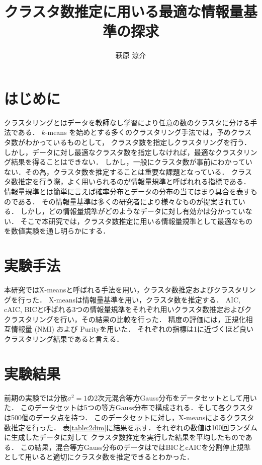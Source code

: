 \documentclass[twocolumn, 10.5pt,a4j]{ltjsarticle}
\author{萩原 涼介}
\title{クラスタ数推定に用いる最適な情報量基準の探求}
\def\tableref#1{表\ref{#1}}
\begin{document}
\maketitle

\section{はじめに}

クラスタリングとはデータを教師なし学習により任意の数のクラスタに分ける手法である．
$k$-means を始めとする多くのクラスタリング手法では，予めクラスタ数がわかっているものとして，
クラスタ数を指定しクラスタリングを行う．しかし，データに対し最適なクラスタ数を指定しなければ，最適なクラスタリング結果を得ることはできない．
しかし，一般にクラスタ数が事前にわかっていない．その為，クラスタ数を推定することは重要な課題となっている．
クラスタ数推定を行う際，よく用いられるのが情報量規準と呼ばれれる指標である．
情報量規準とは簡単に言えば確率分布とデータの分布の当てはまり具合を表すものである．
その情報量基準は多くの研究者により様々なものが提案されている．
しかし，どの情報量規準がどのようなデータに対し有効かは分かっていない．
そこで本研究では，クラスタ数推定に用いる情報量規準として最適なものを数値実験を通し明らかにする．

\section{実験手法}
本研究ではX-meansと呼ばれる手法を用い，クラスタ数推定およびクラスタリングを行った．
X-meansは情報量基準を用い，クラスタ数を推定する．
AIC, cAIC, BICと呼ばれる3つの情報量規準をそれぞれ用いクラスタ数推定およびククラスタリングを行い，その結果の比較を行った．
精度の評価には，正規化相互情報量 (NMI) および Purityを用いた．
それぞれの指標は1に近づくほど良いクラスタリング結果であると言える．

\section{実験結果}
前期の実験では分散$\sigma^2 = 1$の2次元混合等方Gauss分布をデータセットとして用いた．
このデータセットは5つの等方Gauss分布で構成される．そして各クラスタは500個のデータ点を持つ．
このデータセットに対し，X-meansによるクラスタ数推定を行った．
\tableref{table:2dim}に結果を示す．それぞれの数値は100回ランダムに生成したデータに対して
クラスタ数推定を実行した結果を平均したものである．
この結果，混合等方Gauss分布のデータはではBICとcAICを分割停止規準として用いると適切にクラスタ数を推定できるとわかった．
\end{document}
